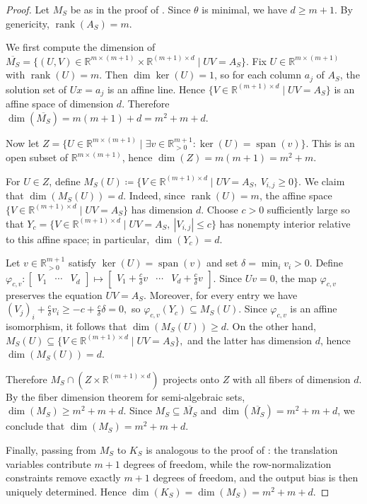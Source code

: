 \documentclass{article}
\theoremstyle{definition}
\newcommand{\R}{\mathbb{R}}
\DeclareMathOperator{\rank}{rank}
\begin{document}
\begin{proof}
Let $M_S$ be as in the proof of . Since $\theta$ is minimal, we have $d \geq m+1$. By genericity, $\rank(A_S) = m$. 

We first compute the dimension of
$
\overline{M_S}
=
\{(U,V)\in \R^{m\times (m+1)}\times \R^{(m+1)\times d}\mid UV=A_S\}.
$
Fix $U \in \R^{m \times (m+1)}$ with $\rank(U)=m$. Then $\dim\ker(U)=1$, so for each column $a_j$ of $A_S$, the solution set of $Ux=a_j$ is an affine line. Hence
$
\{V \in \R^{(m+1) \times d} \mid UV =A_S\}
$
is an affine space of dimension $d$. Therefore
$
\dim(\overline{M_S}) = m(m+1)+d= m^2 + m +d.
$

Now let
$
Z= \{ U \in \R^{m \times (m+1)} \mid \exists v \in \R^{m+1}_{>0}:  \ker(U) = \operatorname{span}(v)\}.
$
This is an open subset of $\R^{m\times (m+1)}$, hence
$
\dim(Z)=m(m+1)=m^2+m.
$

For $U \in Z$, define
$
M_S(U) \coloneqq \{V \in \R^{(m+1) \times d} \mid UV =A_S ,\ V_{i,j} \geq 0\}.
$
We claim that $\dim(M_S(U))=d$. Indeed, since $\rank(U)=m$, the affine space
$
\{V \in \R^{(m+1) \times d} \mid UV =A_S\}
$
has dimension $d$. Choose $c>0$ sufficiently large so that
$
Y_c = \{V \in \R^{(m+1) \times d} \mid UV =A_S ,\ |V_{i,j}| \leq c\}
$
has nonempty interior relative to this affine space; in particular, $\dim(Y_c)=d$.

Let $v\in \R^{m+1}_{> 0}$ satisfy $\ker(U) = \operatorname{span}(v)$ and set
$
\delta = \min_i v_i >0.
$
Define
$
\varphi_{c,v}\colon
\begin{bmatrix}
V_1 & \cdots & V_d
\end{bmatrix}
\mapsto
\begin{bmatrix}
V_1 + \frac{c}{\delta}v & \cdots & V_d +\frac{c}{\delta}v
\end{bmatrix}.
$
Since $Uv=0$, the map $\varphi_{c,v}$ preserves the equation $UV=A_S$. Moreover, for every entry we have
$
(V_j)_i + \frac{c}{\delta}v_i \ge -c + \frac{c}{\delta}\delta =0,
$
so $\varphi_{c,v}(Y_c) \subseteq M_S(U)$. Since $\varphi_{c,v}$ is an affine isomorphism, it follows that
$
\dim(M_S(U)) \ge d.
$
On the other hand,
$
M_S(U)\subseteq \{V\in \R^{(m+1)\times d}\mid UV=A_S\},
$
and the latter has dimension $d$, hence $\dim(M_S(U))=d$.

Therefore
$
M_S\cap (Z\times \R^{(m+1)\times d})
$
projects onto $Z$ with all fibers of dimension $d$. By the fiber dimension theorem for semi-algebraic sets,
$
\dim(M_S)\ge m^2+m+d.
$
Since $M_S\subseteq \overline{M_S}$ and $\dim(\overline{M_S})=m^2+m+d$, we conclude that
$
\dim(M_S)=m^2+m+d.
$

Finally, passing from $M_S$ to $K_S$ is analogous to the proof of : the translation variables contribute $m+1$ degrees of freedom, while the row-normalization constraints remove exactly $m+1$ degrees of freedom, and the output bias is then uniquely determined. Hence 
$\dim(K_S)=\dim(M_S)=m^2+m+d$. 
%
\end{proof}
\end{document}

